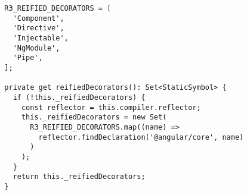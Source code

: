 \begin{verbatim}
  R3_REIFIED_DECORATORS = [
    'Component',
    'Directive',
    'Injectable',
    'NgModule',
    'Pipe',
  ];

  private get reifiedDecorators(): Set<StaticSymbol> {
    if (!this._reifiedDecorators) {
      const reflector = this.compiler.reflector;
      this._reifiedDecorators = new Set(
        R3_REIFIED_DECORATORS.map((name) =>
          reflector.findDeclaration('@angular/core', name)
        )
      );
    }
    return this._reifiedDecorators;
  }
\end{verbatim}
